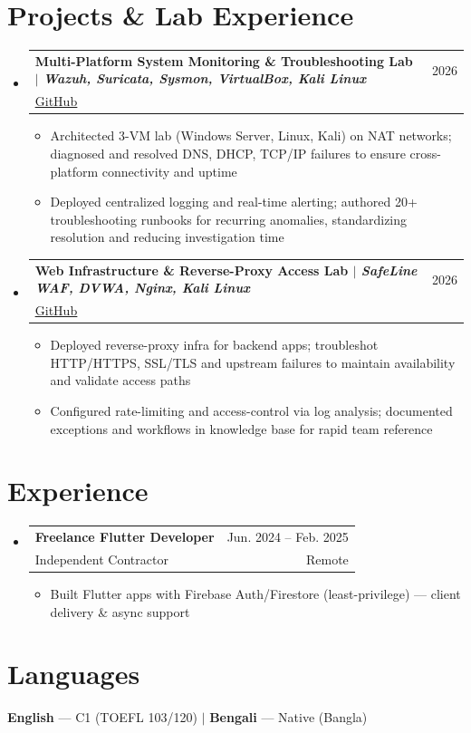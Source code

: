\documentclass[a4paper,11pt]{article}
\makeatletter
\newcommand{\CVItem}[1]{\item\small{{#1 \vspace{-2pt}}}}
\newcommand{\CVSubheading}[4]{
  \vspace{-2pt}\item
    \begin{tabular*}{0.97\textwidth}[t]{l@{\extracolsep{\fill}}r}
      \textbf{#1} & #2 \\
      \small#3 & \small #4 \\
    \end{tabular*}\vspace{-7pt}
}
\newcommand{\CVSubHeadingListStart}{\begin{itemize}[leftmargin=0.5cm, label={}]}
\newcommand{\CVSubHeadingListEnd}{\end{itemize}}
\newcommand{\CVItemListStart}{\begin{itemize}}
\newcommand{\CVItemListEnd}{\end{itemize}\vspace{-5pt}}
\makeatother
\begin{document}
\section{Projects \& Lab Experience}
  \CVSubHeadingListStart
    \CVSubheading
      {{Multi-Platform System Monitoring \& Troubleshooting Lab} $|$ \emph{\small{Wazuh, Suricata, Sysmon, VirtualBox, Kali Linux}}}{2026}
      {\href{https://github.com/Sohanuzzaman3301/SIEM_Home_Lab}{\underline{GitHub}}}{}
      \CVItemListStart
        \CVItem{Architected 3-VM lab (Windows Server, Linux, Kali) on NAT networks; diagnosed and resolved DNS, DHCP, TCP/IP failures to ensure cross-platform connectivity and uptime}
        \CVItem{Deployed centralized logging and real-time alerting; authored 20+ troubleshooting runbooks for recurring anomalies, standardizing resolution and reducing investigation time}
      \CVItemListEnd
    \CVSubheading
      {{Web Infrastructure \& Reverse-Proxy Access Lab} $|$ \emph{\small{SafeLine WAF, DVWA, Nginx, Kali Linux}}}{2026}
      {\href{https://github.com/Sohanuzzaman3301/safeline-waf-homelab}{\underline{GitHub}}}{}
      \CVItemListStart
        \CVItem{Deployed reverse-proxy infra for backend apps; troubleshot HTTP/HTTPS, SSL/TLS and upstream failures to maintain availability and validate access paths}
        \CVItem{Configured rate-limiting and access-control via log analysis; documented exceptions and workflows in knowledge base for rapid team reference}
      \CVItemListEnd
  \CVSubHeadingListEnd

\section{Experience}
  \CVSubHeadingListStart
    \CVSubheading
      {Freelance Flutter Developer}{Jun. 2024 -- Feb. 2025}
      {Independent Contractor}{Remote}
      \CVItemListStart
        \CVItem{Built Flutter apps with Firebase Auth/Firestore (least-privilege) — client delivery \& async support}
      \CVItemListEnd
  \CVSubHeadingListEnd

\section{Languages}
  \begin{itemize}[leftmargin=0.5cm, label={}]
     \small{\item{\textbf{English} — C1 (TOEFL 103/120) $|$ \textbf{Bengali} — Native (Bangla)}}
  \end{itemize}
\end{document}
